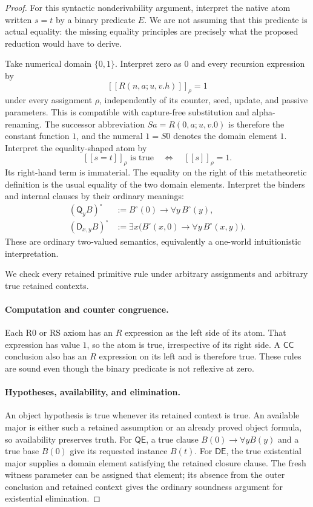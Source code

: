 \documentclass[11pt,letterpaper]{article}
\theoremstyle{definition}\newtheorem{definition}[theorem]{Definition}
\theoremstyle{remark}\newtheorem{remark}[theorem]{Remark}
\newcommand{\llbracket}{[\![}
\newcommand{\rrbracket}{]\!]}
\begin{document}
\begin{proof}
For this syntactic nonderivability argument, interpret the native atom
written $s=t$ by a binary predicate $E$. We are not assuming that this
predicate is actual equality: the missing equality principles are
precisely what the proposed reduction would have to derive.

Take numerical domain $\{0,1\}$. Interpret zero as $0$ and every
recursion expression by
\[
       \llbracket R(n,a;u,v.h)\rrbracket_\rho=1
\]
under every assignment $\rho$, independently of its counter, seed,
update, and passive parameters. This is compatible with capture-free
substitution and alpha-renaming. The successor abbreviation
$Sa=R(0,a;u,v.0)$ is therefore the constant function $1$, and the
numeral $1=S0$ denotes the domain element $1$.
Interpret the equality-shaped atom by
\[
       \llbracket s=t\rrbracket_\rho\text{ is true}
       \quad\Longleftrightarrow\quad
       \llbracket s\rrbracket_\rho=1.
 \tag{Predicate interpretation}
\]
Its right-hand term is immaterial. The equality on the right of this
metatheoretic definition is the usual equality of the two domain elements.
Interpret the binders and internal clauses by their ordinary meanings:
\[
 \begin{aligned}
  (\mathsf Q_y B)^\circ
    &:=B^\circ(0)\to\forall y\,B^\circ(y),\\
  (\mathsf D_{x,y}B)^\circ
    &:=\exists x\bigl(B^\circ(x,0)\to\forall y\,B^\circ(x,y)\bigr).
 \end{aligned}
\]
These are ordinary two-valued semantics, equivalently a one-world
intuitionistic interpretation.

We check every retained primitive rule under arbitrary assignments and
arbitrary true retained contexts.

\paragraph{Computation and counter congruence.}
Each R0 or RS axiom has an $R$ expression as the left side of its atom.
That expression has value $1$, so the atom is true, irrespective of its
right side. A $\mathsf{CC}$ conclusion also has an $R$ expression on
its left and is therefore true. These rules are sound even though the
binary predicate is not reflexive at zero.

\paragraph{Hypotheses, availability, and elimination.}
An object hypothesis is true whenever its retained context is true.
An available major is either such a retained assumption or an already
proved object formula, so availability preserves truth.
For $\mathsf{QE}$, a true clause
$B(0)\to\forall yB(y)$ and a true base $B(0)$ give its requested
instance $B(t)$. For $\mathsf{DE}$, the true existential major supplies
a domain element satisfying the retained closure clause. The fresh
witness parameter can be assigned that element; its absence from the
outer conclusion and retained context gives the ordinary soundness
argument for existential elimination.


\end{proof}
\end{document}

